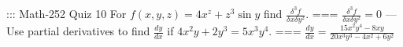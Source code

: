::: Math-252 Quiz 10
For \(f(x,y,z)=4x^z+z^3\sin y\) find \(\displaystyle\frac{\delta^3 f}{\delta
x\delta y^2}\).
===
\(\displaystyle\frac{\delta^3 f}{\delta x\delta y^2}=0\)
---
Use partial derivatives to find \(\displaystyle\frac{dy}{dx}\) if \(4x^2y+2y^3=5x^3y^4\).
===
\(\displaystyle\frac{dy}{dx}=\frac{15x^2y^4-8xy}{20x^3y^3-4x^2+6y^2}\)
